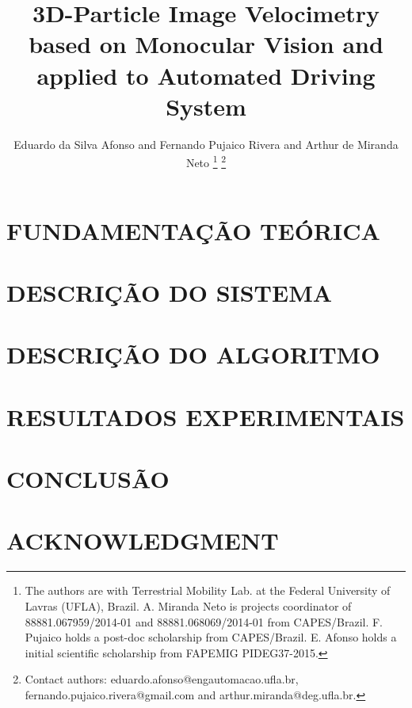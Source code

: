 \documentclass[letterpaper, 10 pt,conference]{ieeeconf}  %
\title{\LARGE \bf
3D-Particle Image Velocimetry based on Monocular Vision and applied to Automated Driving System
}
\author{Eduardo da Silva Afonso and Fernando Pujaico Rivera and Arthur de Miranda Neto%
\thanks{The authors are with Terrestrial Mobility Lab. at the Federal University of Lavras (UFLA), Brazil. 
A. Miranda Neto is projects coordinator
of 88881.067959/2014-01 and 88881.068069/2014-01 from CAPES/Brazil. 
F. Pujaico holds a post-doc scholarship from CAPES/Brazil. 
E. Afonso holds a initial scientific scholarship from FAPEMIG PIDEG37-2015.}%
\thanks{Contact authors: eduardo.afonso@engautomacao.ufla.br, fernando.pujaico.rivera@gmail.com and
arthur.miranda@deg.ufla.br.}%
}
\begin{document}
\maketitle
\thispagestyle{empty}
\pagestyle{empty}

\begin{abstract}



\end{abstract}



\section{FUNDAMENTAÇÃO TEÓRICA}




\section{DESCRIÇÃO DO SISTEMA}


\section{DESCRIÇÃO DO ALGORITMO}
 





\section{RESULTADOS EXPERIMENTAIS}





\section{CONCLUSÃO}


\section*{ACKNOWLEDGMENT}



\end{document}
